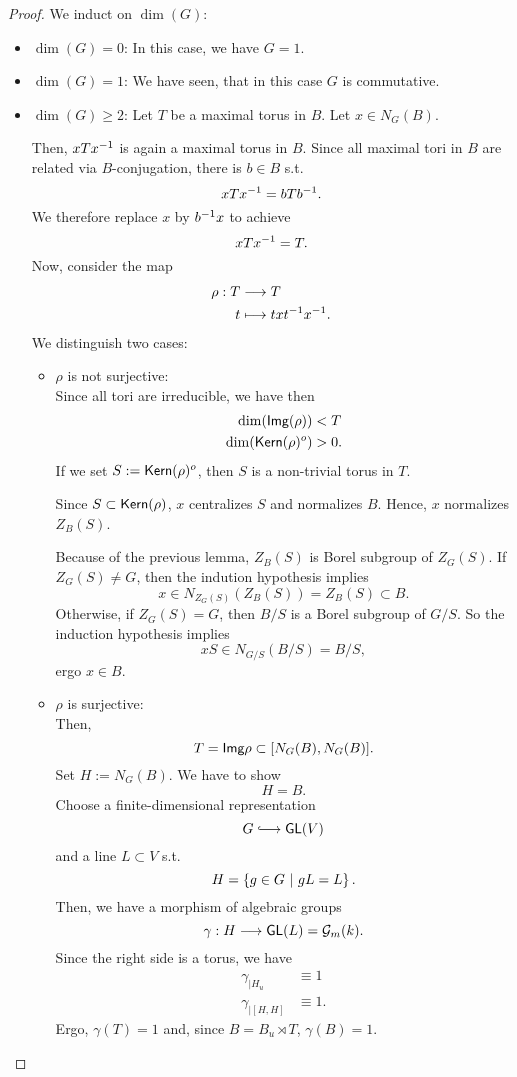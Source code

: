 \begin{proof}
	We induct on $\dim(G)$:
	\begin{itemize}
		\item $\dim (G) = 0$: In this case, we have $G = 1$.
		\item $\dim(G) = 1$: We have seen, that in this case $G$ is commutative.
		\item $\dim(G) \geq 2$:
		Let $T$ be a maximal torus in $B$. Let $x \in N_G(B)$.
		
		Then, $xTx^{-1}$ is again a maximal torus in $B$. Since all maximal tori in $B$ are related via $B$-conjugation, there is $b \in B$ s.t.
		\[ xTx^{-1} = bTb^{-1}. \]
		We therefore replace $x$ by $b^{-1} x$ to achieve
		\[ xTx^{-1} = T. \]
		Now, consider the map
		\begin{align*}
		\rho : T & \overset{}{\longrightarrow} T\\
		t &\longmapsto txt^{-1} x^{-1}.
		\end{align*}
		We distinguish two cases:
		\begin{itemize}
			\item $\rho$ is not surjective:\\
			Since all tori are irreducible, we have then
			\begin{align*}
			\dim(\textsf{Img}(\rho)) &< T\\
			\dim(\textsf{Kern}(\rho)^o) & >0.\\
			\end{align*}
			If we set $S:=\textsf{Kern}(\rho)^o$, then $S$ is a non-trivial torus in $T$.
			
			Since $S \subset \textsf{Kern} (\rho)$, $x$ centralizes $S$ and normalizes $B$. Hence, $x$ normalizes $Z_B(S)$.
			
			Because of the previous lemma, $Z_B(S)$ is Borel subgroup of $Z_G(S)$. If $Z_G(S) \neq G$, then the indution hypothesis implies
			\[ x \in N_{Z_G(S)}(Z_B(S)) = Z_B(S) \subset B. \]
			Otherwise, if $Z_G(S) = G$, then $B/S$ is a Borel subgroup of $G/S$. So the induction hypothesis implies
			\[ xS \in N_{G/S} (B/S) = B/S, \]
			ergo $x \in B$.
			\item $\rho$ is surjective:\\
			Then,
			\[ T = \textsf{Img} \rho \subset [N_G(B), N_G(B)]. \]
			Set $H := N_G(B)$. We have to show
			\[ H =B. \]
			Choose a finite-dimensional representation
			\[ G \Inj{} \GL(V) \]
			and a line $L \subset V$ s.t.
			\[ H = \left\lbrace g \in G ~ | ~ gL = L\right\rbrace. \]
			Then, we have a morphism of algebraic groups
			\[ \gamma : H \overset{}{\longrightarrow} \textsf{GL}(L) = \mathcal{G}_m(k). \]
			Since the right side is a torus, we have
			\begin{align*}
			\gamma_{| H_u} &\equiv 1\\
			\gamma_{|[H,H]} & \equiv 1.
			\end{align*}
			Ergo, $\gamma(T) = 1$ and, since $B = B_u \rtimes T$, $\gamma(B) = 1$.
			

\end{itemize}
\end{itemize}
\end{proof}
